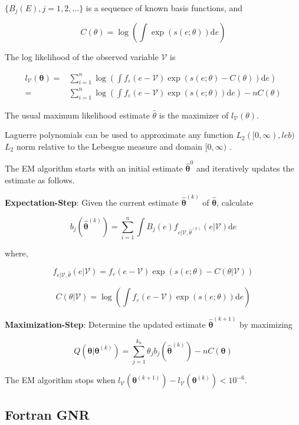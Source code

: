 \documentclass[
  12pt]{article}
\theoremstyle{definition}
\theoremstyle{remark}
\begin{document}
\(\{B_j(E), j=1,2,\dots\}\) is a sequence of known basis functions, and

\[
C(\theta) = \log\left(\int \exp(s(e;\theta)) \text{d}e \right)
\]

The log likelihood of the observed variable \(\mathcal{V}\) is

\[
\begin{aligned}
    l_{\mathcal{V}}(\mathbf{\theta})=&\sum_{i=1}^{n}\log \left(\int f_{\varepsilon}(e-\mathcal{V})\exp(s(e;\theta)-C(\theta))\text{d}e\right)\\
    =&\sum_{i=1}^{n}\log \left(\int f_{\varepsilon}(e-\mathcal{V})\exp(s(e;\theta))\text{d}e\right)-nC(\theta)
\end{aligned}
\]

The usual maximum likelihood estimate \(\hat{\theta}\) is the maximizer
of \(l_{\mathcal{V}}(\theta)\).

Laguerre polynomials can be used to approximate any function
\(L_2([0,\infty), leb)\) \(L_2\) norm relative to the Lebesgue measure
and domain \([0,\infty)\) \citep{Chen2007}.

The EM algorithm \citep{Kang2021} starts with an initial estimate
\(\hat{\mathbf{\theta}}^0\) and iteratively updates the estimate as
follows.

\textbf{Expectation-Step}: Given the current estimate
\(\hat{\mathbf{\theta}}^{(k)}\) of \(\hat{\mathbf{\theta}}\), calculate

\[
 b_j \left(\hat{\mathbf{\theta}}^{(k)}\right) = \sum_{i=1}^{n}\int B_j(e)f_{e|\mathcal{V},\hat{\theta}^{(k)}}(e|\mathcal{V})\text{d}e
\]

where,

\[
f_{e|\mathcal{V},\hat{\theta}}(e|\mathcal{V}) = f_{\varepsilon}(e-\mathcal{V})\exp(s(e;\theta)-C(\theta|\mathcal{V}))
\]

\[
C(\theta|\mathcal{V})=\log\left(\int f_{\varepsilon}(e-\mathcal{V})\exp(s(e;\theta))\text{d}e\right)
\]

\textbf{Maximization-Step}: Determine the updated estimate
\(\hat{\mathbf{\theta}}^{(k+1)}\) by maximizing

\[
Q(\mathbf{\theta}|\mathbf{\theta}^{(k)}) = \sum_{j=1}^{k_n}\theta_j b_j \left(\hat{\mathbf{\theta}}^{(k)}\right) - nC(\mathbf{\theta})
\]

The EM algorithm stops when
\(l_{\mathcal{V}}(\mathbf{\theta}^{(k+1)})-l_{\mathcal{V}}(\mathbf{\theta}^{(k)})<10^{-6}\).

\subsection{Fortran GNR}\label{fortran-gnr}
\end{document}
